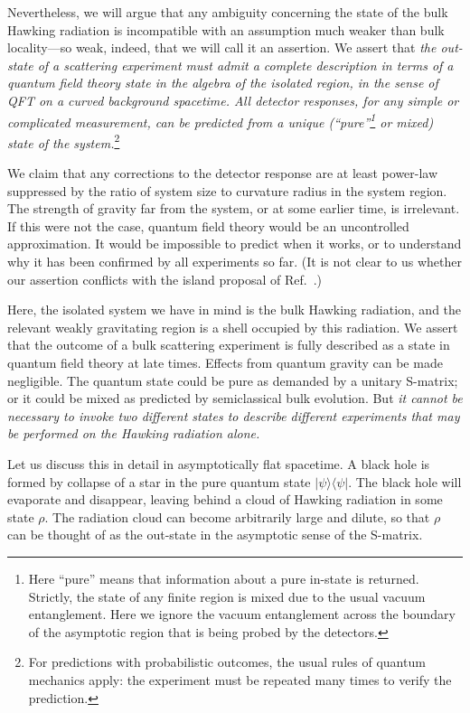 \documentclass[12pt,letterpaper]{article}
\begin{document}
Nevertheless, we will argue that any ambiguity concerning the state of the bulk Hawking radiation is incompatible with an assumption much weaker than bulk locality---so weak, indeed, that we will call it an assertion. We assert that {\em the
out-state of a scattering experiment must admit a complete description in terms of a quantum field theory state in the algebra of the isolated region, in the sense of QFT on a curved background spacetime. All detector responses, for any simple or complicated measurement, can be predicted from a unique (``pure''\footnote{Here
  ``pure'' means that information about a pure in-state is returned. Strictly, the state of any finite region is mixed due to the usual vacuum entanglement. Here we ignore the vacuum entanglement across the boundary of the asymptotic region that is being probed by the detectors.} or mixed) state of the system.}\footnote{For predictions with probabilistic outcomes, the usual rules of quantum mechanics apply: the experiment must be repeated many times to verify the prediction.}

We claim that any corrections to the detector response are at least power-law suppressed by the ratio of system size to curvature radius in the system region. The strength of gravity far from the system, or at some earlier time, is irrelevant. If this were not the case, quantum field theory would be an uncontrolled approximation. It would be impossible to predict when it works, or to understand why it has been confirmed by all experiments so far. (It is not clear to us whether our assertion conflicts with the island proposal of Ref.~\cite{AMMZ}.) 

Here, the isolated system we have in mind is the bulk Hawking radiation, and the relevant weakly gravitating region is a shell occupied by this radiation. We assert that the outcome of a bulk scattering experiment is fully described as a state in quantum field theory at late times. Effects from quantum gravity can be made negligible. The quantum state could be pure as demanded by a unitary S-matrix; or it could be mixed as predicted by semiclassical bulk evolution. But {\em it cannot be necessary to invoke two different states to describe different experiments that may be performed on the Hawking radiation alone.}

Let us discuss this in detail in asymptotically flat spacetime. A black hole is formed by collapse of a star in the pure quantum state $|\psi\rangle \langle\psi|$. The black hole will evaporate and disappear, leaving behind a cloud of Hawking radiation in some state $\rho$. The radiation cloud can become arbitrarily large and dilute, so that $\rho$ can be thought of as the out-state in the asymptotic sense of the S-matrix.
\end{document}
